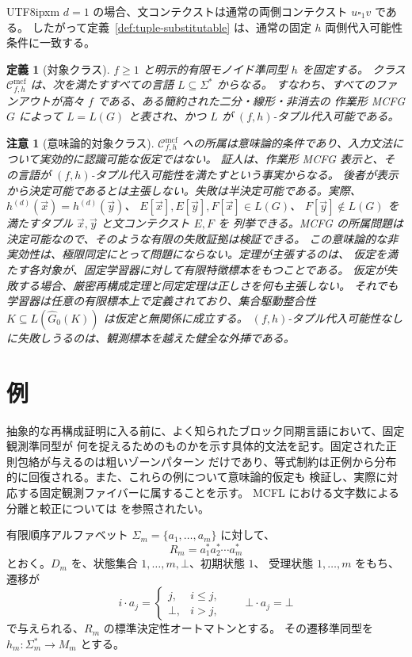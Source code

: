 \documentclass[10pt,a4paper]{article}
\newtheorem{definition}[theorem]{定義}
\newtheorem{remark}[theorem]{注意}
\theoremstyle{remark}
\newcommand{\Cmcf}[2]{\mathcal{C}^{\mathrm{mcf}}_{#1,#2}}
\newcommand{\tuple}[1]{\vec{#1}}
\newcommand{\blank}{\square}
\begin{document}
\begin{CJK}{UTF8}{ipxm}
\(d=1\) の場合、文コンテクストは通常の両側コンテクスト \(u\blank_1v\) である。
したがって定義~\ref{def:tuple-substitutable} は、通常の固定 \(h\) 両側代入可能性条件に一致する。

\begin{definition}[対象クラス]
\label{def:class-cmcf}
\(f\ge1\) と明示的有限モノイド準同型 \(h\) を固定する。
クラス \(\Cmcf{f}{h}\) は、次を満たすすべての言語 \(L\subseteq\Sigma^*\) からなる。
すなわち、すべてのファンアウトが高々 \(f\) である、ある簡約された二分・線形・非消去の
作業形 MCFG \(G\) によって \(L=L(G)\) と表され、かつ \(L\) が
\((f,h)\)-タプル代入可能である。
\end{definition}

\begin{remark}[意味論的対象クラス]
\label{rem:semantic-class}
\(\Cmcf{f}{h}\) への所属は意味論的条件であり、入力文法について実効的に認識可能な仮定ではない。
証人は、作業形 MCFG 表示と、その言語が \((f,h)\)-タプル代入可能性を満たすという事実からなる。
後者が表示から決定可能であるとは主張しない。失敗は半決定可能である。実際、
\(h^{(d)}(\tuple x)=h^{(d)}(\tuple y)\)、
\(E[\tuple x],E[\tuple y],F[\tuple x]\in L(G)\)、
\(F[\tuple y]\notin L(G)\) を満たすタプル \(\tuple x,\tuple y\) と文コンテクスト \(E,F\) を
列挙できる。MCFG の所属問題は決定可能なので、そのような有限の失敗証拠は検証できる。
この意味論的な非実効性は、極限同定にとって問題にならない。定理が主張するのは、
仮定を満たす各対象が、固定学習器に対して有限特徴標本をもつことである。
仮定が失敗する場合、厳密再構成定理と同定定理は正しさを何も主張しない。
それでも学習器は任意の有限標本上で定義されており、集合駆動整合性
\(K\subseteq L(\widehat G_0(K))\) は仮定と無関係に成立する。
\((f,h)\)-タプル代入可能性なしに失敗しうるのは、観測標本を越えた健全な外挿である。
\end{remark}

\section{例}
\label{sec:running-examples}

抽象的な再構成証明に入る前に、よく知られたブロック同期言語において、固定観測準同型が
何を捉えるためのものかを示す具体的文法を記す。固定された正則包絡が与えるのは粗いゾーンパターン
だけであり、等式制約は正例から分布的に回復される。また、これらの例について意味論的仮定も
検証し、実際に対応する固定観測ファイバーに属することを示す。
MCFL における文字数による分離と較正については \cite{LehnerLindorfer2020} を参照されたい。

有限順序アルファベット \(\Sigma_m=\{a_1,\ldots,a_m\}\) に対して、
\[
  R_m=a_1^*a_2^*\cdots a_m^*
\]
とおく。\(D_m\) を、状態集合 \(1,\ldots,m,\bot\)、初期状態 \(1\)、
受理状態 \(1,\ldots,m\) をもち、遷移が
\[
  i\cdot a_j=
  \begin{cases}
    j, & i\le j,\\
    \bot, & i>j,
  \end{cases}
  \qquad
  \bot\cdot a_j=\bot
\]
で与えられる、\(R_m\) の標準決定性オートマトンとする。
その遷移準同型を \(h_m:\Sigma_m^*\to M_m\) とする。


\end{CJK}
\end{document}
